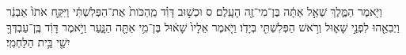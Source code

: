 \documentclass{openreader}
\begin{document}
וַיֹּ֖אמֶר הַמֶּ֑לֶךְ שְׁאַ֣ל אַתָּ֔ה בֶּן־מִי־זֶ֖ה הָעָֽלֶם׃ ס 
וּכְשׁ֣וּב דָּוִ֗ד מֵֽהַכֹּות֙ אֶת־הַפְּלִשְׁתִּ֔י וַיִּקַּ֤ח אֹתֹו֙ אַבְנֵ֔ר וַיְבִאֵ֖הוּ לִפְנֵ֣י שָׁא֑וּל וְרֹ֥אשׁ הַפְּלִשְׁתִּ֖י בְּיָדֹֽו׃ 
וַיֹּ֤אמֶר אֵלָיו֙ שָׁא֔וּל בֶּן־מִ֥י אַתָּ֖ה הַנָּ֑עַר וַיֹּ֣אמֶר דָּוִ֔ד בֶּֽן־עַבְדְּךָ֥ יִשַׁ֖י בֵּ֥ית הַלַּחְמִֽי׃ 
\end{document}
